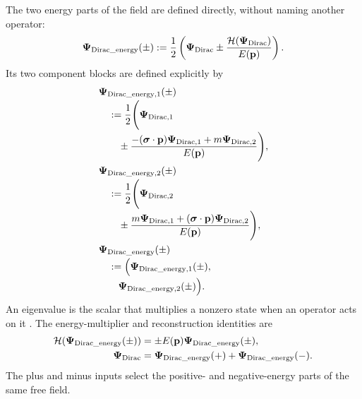 \documentclass[10pt,letterpaper]{article}
\let\STAamsmathtext\text
\newcommand{\eqtext}[1]{\STAamsmathtext{\normalfont\rmfamily #1}}
\renewcommand{\text}[1]{\STAamsmathtext{\normalfont\rmfamily #1}}
\newcommand{\pv}[1]{#1}
\newcommand{\vct}[1]{\mathbf{#1}}
\newcommand{\sigv}{\vct{\pv{\bm{\sigma}}}}
\newcommand{\bPsi}{\pv{\bm{\Psi}}}
\begin{document}
The two energy parts of the field are defined directly, without naming
another operator:
\begin{equation}
\bPsi_{\eqtext{Dirac\_energy}}(\pm)
:=\frac12\left(
\bPsi_{\eqtext{Dirac}}
\pm\frac{\mathcal{H}(\bPsi_{\eqtext{Dirac}})}{E(\vct{p})}
\right).
\label{eq:energy-projected-field}
\end{equation}
Its two component blocks are defined explicitly by
\begin{equation}
\begin{aligned}
&\bPsi_{\eqtext{Dirac\_energy},1}(\pm)\\[-0.2em]
&\quad:=\frac12\Biggl(
\bPsi_{\eqtext{Dirac},1}\\[-0.2em]
&\qquad\pm\frac{
-(\sigv\cdot\vct{p})\bPsi_{\eqtext{Dirac},1}
+m\bPsi_{\eqtext{Dirac},2}
}{E(\vct{p})}
\Biggr),\\
&\bPsi_{\eqtext{Dirac\_energy},2}(\pm)\\[-0.2em]
&\quad:=\frac12\Biggl(
\bPsi_{\eqtext{Dirac},2}\\[-0.2em]
&\qquad\pm\frac{
m\bPsi_{\eqtext{Dirac},1}
+(\sigv\cdot\vct{p})\bPsi_{\eqtext{Dirac},2}
}{E(\vct{p})}
\Biggr),\\
&\bPsi_{\eqtext{Dirac\_energy}}(\pm)\\[-0.2em]
&\quad:=\Bigl(
\bPsi_{\eqtext{Dirac\_energy},1}(\pm),\\[-0.2em]
&\qquad
\bPsi_{\eqtext{Dirac\_energy},2}(\pm)
\Bigr).
\end{aligned}
\label{eq:energy-projected-components}
\end{equation}
An eigenvalue is the scalar that multiplies a nonzero state when an operator
acts on it \cite{sakurai2017}. The energy-multiplier and reconstruction
identities are
\begin{equation}
\begin{aligned}
\mathcal{H}(\bPsi_{\eqtext{Dirac\_energy}}(\pm))
&=\pm E(\vct{p})\bPsi_{\eqtext{Dirac\_energy}}(\pm),\\
\bPsi_{\eqtext{Dirac}}
&=\bPsi_{\eqtext{Dirac\_energy}}(+)
+\bPsi_{\eqtext{Dirac\_energy}}(-).
\end{aligned}
\label{eq:energy-projection-properties}
\end{equation}
The plus and minus inputs select the positive- and negative-energy parts of
the same free field.
\end{document}
